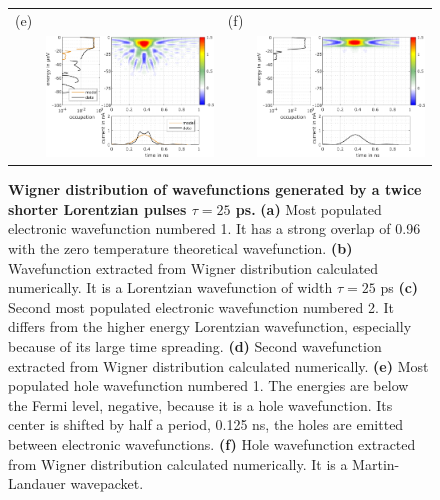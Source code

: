 \begin{figure}[hptb]
\begin{center}
\begin{tabular}{c c c c}
			(e) & & (f) & \\
			& \includegraphics[width = 6.5 cm]{./chap1/wannierwigData_leviton_20ps_1e_51mK_Projected_Gradient_Method-ho-0} & &
			\includegraphics[width = 6.5 cm]{./chap1/wannierwigTheory_leviton_25ps_1e_50mK-ho-0}
		\end{tabular} 
	\end{center}
	\caption{\textbf{Wigner distribution of wavefunctions generated by a twice shorter Lorentzian pulses $\tau = 25$ ps.} \textbf{(a)} Most populated electronic wavefunction numbered 1. It has a strong overlap of 0.96 with the zero temperature theoretical wavefunction. \textbf{(b)} Wavefunction extracted from Wigner distribution calculated numerically. It is a Lorentzian wavefunction of width $\tau = 25$ ps \textbf{(c)} Second most populated electronic wavefunction numbered 2. It differs from the higher energy Lorentzian wavefunction, especially because of its large time spreading. \textbf{(d)}  Second wavefunction extracted from Wigner distribution calculated numerically. \textbf{(e)} Most populated hole wavefunction numbered 1. The energies are below the Fermi level, negative, because it is a hole wavefunction. Its center is shifted by half a period, 0.125 ns, the holes are emitted between electronic wavefunctions. \textbf{(f)} Hole wavefunction extracted from Wigner distribution calculated numerically. It is a Martin-Landauer wavepacket.}
	\label{fig: wannier du 1e 20ps}
\end{figure}


